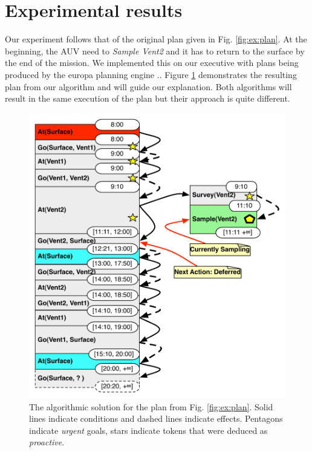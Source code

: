 
\section{Experimental results}
\label{sec:exp}


Our experiment follows that of the original plan given in
Fig. \ref{fig:ex:plan}. At the beginning, the AUV need to {\em Sample Vent2}
and it has to return to the surface by the end of the mission. We
implemented this on our executive with plans being produced by the
europa planning engine \cite{frank2003}.. Figure \ref{fig:ex:mixed1}
demonstrates the resulting plan from our algorithm and will guide our
explanation. Both algorithms will result in the same execution of the
plan but their approach is quite different.

\begin{figure}
  \centering
  \includegraphics[width=0.8\columnwidth]{figs/example_MixedInitial}
  \caption{\small The algorithmic solution for the plan from
    Fig. \ref{fig:ex:plan}. Solid lines indicate conditions and
    dashed lines indicate effects. Pentagons indicate {\em urgent}
    goals, stars indicate tokens that were deduced as {\em proactive}.}
  \label{fig:ex:mixed1}
\end{figure}


